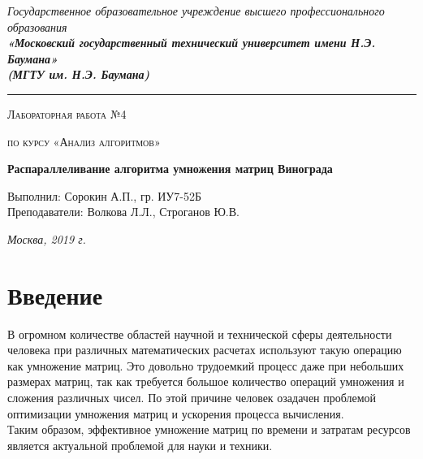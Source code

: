 \documentclass[12pt, a4paper]{report}
\begin{document}
    \begin{titlepage}

        \begin{center}
            \Large
            {\sl Государственное образовательное учреждение высшего профессионального образования\\
            {\bf«Московский государственный технический университет имени Н.Э. Баумана»\\
				(МГТУ им. Н.Э. Баумана)}}
				\noindent\rule{\textwidth}{2pt}
            \vspace{3cm}

			{\scshape\LARGE Лабораторная работа №4 \par}
			\vspace{0.5cm}	
			{\scshape\LARGE по курсу «Анализ алгоритмов» \par}
			\vspace{1.5cm}
			{\huge\bfseries Распараллеливание алгоритма умножения матриц Винограда \par}
			\vspace{2cm}
			\Large Выполнил: Сорокин А.П., гр. ИУ7-52Б\\
			\vspace{0.5cm}
			{\Large Преподаватели: Волкова Л.Л., Строганов Ю.В.}
		
			\vfill
			\Large \textit {Москва, 2019 г.}
            
        \end{center}

    \end{titlepage}
	
	\tableofcontents

	\chapter*{Введение}
	
	\hspace{1cm}В огромном количестве областей научной и технической сферы деятельности человека при различных математических расчетах используют такую операцию как умножение матриц. Это довольно трудоемкий процесс даже при небольших размерах матриц, так как требуется большое количество операций умножения и сложения различных чисел. По этой причине человек озадачен проблемой оптимизации умножения матриц и ускорения процесса вычисления.\\
	Таким образом, эффективное умножение матриц по времени и затратам ресурсов является актуальной проблемой для науки и техники.
\end{document}
